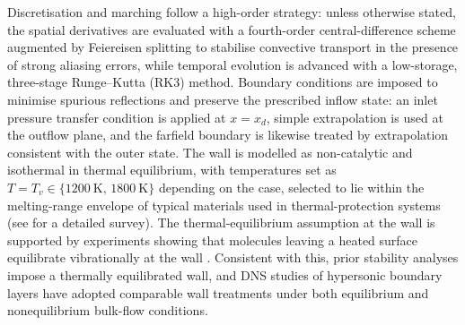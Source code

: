 Discretisation and marching follow a high-order strategy: unless otherwise stated, the spatial derivatives are evaluated with a fourth-order central-difference scheme augmented by Feiereisen splitting to stabilise convective transport in the presence of strong aliasing errors, while temporal evolution is advanced with a low-storage, three-stage Runge–Kutta (RK3) method. Boundary conditions are imposed to minimise spurious reflections and preserve the prescribed inflow state: an inlet pressure transfer condition is applied at $x=x_d$, simple extrapolation is used at the outflow plane, and the farfield boundary is likewise treated by extrapolation consistent with the outer state. The wall is modelled as non-catalytic and isothermal in thermal equilibrium, with temperatures set as $T=T_v\in\{1200~\mathrm{K},\,1800~\mathrm{K}\}$ depending on the case, selected to lie within the melting-range envelope of typical materials used in thermal-protection systems (see \cite{CedillosBarraza2016} for a detailed survey). The thermal-equilibrium assumption at the wall is supported by experiments showing that molecules leaving a heated surface equilibrate vibrationally at the wall \cite{Park1990,CandlerNompelis2021}. Consistent with this, prior stability analyses \cite{Hudson1997,MiroMiro2019,Bitter2015} impose a thermally equilibrated wall, and DNS studies of hypersonic boundary layers \cite{passiatore2022,DiRenzo2021} have adopted comparable wall treatments under both equilibrium and nonequilibrium bulk-flow conditions.





